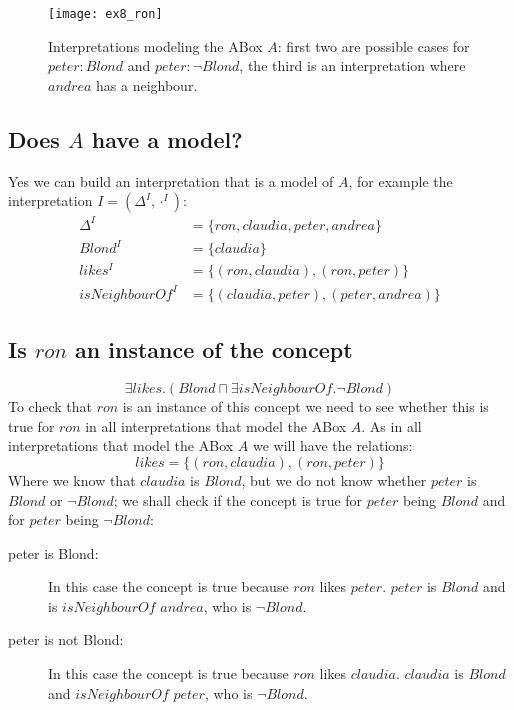 \documentclass[a4paper,12pt]{article}
\begin{document}
\begin{figure}[bp]
\centering
\texttt{[image: ex8\_ron]}
\caption{Interpretations modeling the ABox $A$: first two are possible cases
for $ peter : Blond $ and $ peter : \neg Blond $, the third is an
interpretation where $andrea$ has a neighbour.}
\label{ronandfriends}
\end{figure}

\subsection[Model]{Does $A$ have a model?}
\label{roninterpretation}
Yes we can build an interpretation that is a model of $A$, for example the
interpretation $ I = (\Delta^I, \cdot^I) $:
\begin{align*}
       \Delta^I &= \{ron, claudia, peter, andrea\}\\
        Blond^I &= \{claudia\}\\
        likes^I &= \{(ron,claudia),(ron,peter)\}\\
isNeighbourOf^I &= \{(claudia,peter),(peter,andrea)\}
\end{align*}

\subsection[Exists]{Is $ron$ an instance of the concept}
\begin{equation*}
\exists likes.(Blond \sqcap \exists isNeighbourOf. \neg Blond)
\end{equation*}
To check that $ron$ is an instance of this concept we need to see whether this
is true for $ron$ in all interpretations that model the ABox $A$.  As in all
interpretations that model the ABox $A$ we will have the relations:
\begin{equation*}
likes = \{(ron,claudia),(ron,peter)\}
\end{equation*}
Where we know that $claudia$ is $Blond$, but we do not know whether $peter$ is
$Blond$ or $\neg Blond$; we shall check if the concept is true for $peter$
being $Blond$ and for $peter$ being $\neg Blond$:
\begin{description}
\item[peter is Blond:] In this case the concept is true because $ron$ likes
$peter$.  $peter$ is $Blond$ and is $isNeighbourOf$ $andrea$, who is $\neg
Blond$.

\item[peter is not Blond:] In this case the concept is true because $ron$ likes
$claudia$.  $claudia$ is $Blond$ and $isNeighbourOf$ $peter$, who is $\neg
Blond$.
\end{description}
\end{document}
